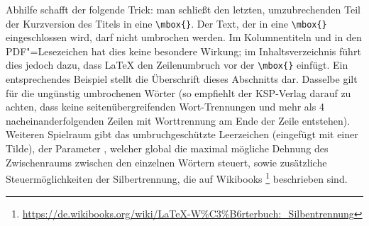Abhilfe schafft der folgende Trick:
man schließt den letzten, umzubrechenden Teil der Kurzversion des Titels in eine \verb+\mbox{}+.
Der Text, der in eine \verb+\mbox{}+ eingeschlossen wird, darf nicht umbrochen werden.
Im Kolumnentiteln und in den PDF"=Lesezeichen hat dies keine besondere Wirkung;
im Inhaltsverzeichnis führt dies jedoch dazu, dass \LaTeX{} den Zeilenumbruch vor der \verb+\mbox{}+ einfügt.
Ein entsprechendes Beispiel stellt die Überschrift dieses Abschnitts dar.
Dasselbe gilt für die ungünstig umbrochenen Wörter
(so empfiehlt der KSP-Verlag darauf zu achten, dass keine seitenübergreifenden Wort-Trennungen und mehr als 4 nacheinanderfolgenden Zeilen mit Worttrennung am Ende der Zeile entstehen).
Weiteren Spielraum gibt das umbruchgeschützte Leerzeichen (eingefügt mit einer Tilde),
der Parameter , welcher global die maximal mögliche Dehnung des Zwischenraums zwischen den einzelnen Wörtern steuert,
sowie zusätzliche Steuermöglichkeiten der Silbertrennung, die auf Wikibooks%
\footnote{\url{https://de.wikibooks.org/wiki/LaTeX-W%C3%B6rterbuch:_Silbentrennung}}
beschrieben sind.